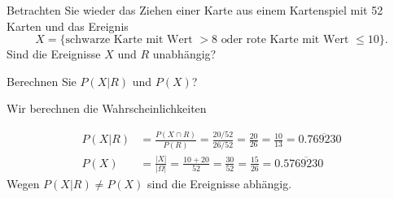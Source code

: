 Betrachten Sie wieder das Ziehen einer Karte aus einem Kartenspiel
mit 52 Karten und das Ereignis
\[
X
=
\{
\text{schwarze Karte mit Wert $>8$ oder rote Karte mit Wert $\le 10$}
\}.
\]
Sind die Ereignisse $X$ und $R$ unabhängig?

\begin{hinweis}
Berechnen Sie $P(X|R)$ und $P(X)$?
\end{hinweis}

Wir berechnen die Wahrscheinlichkeiten
\begin{loesung}
\begin{align*}
P(X|R)
&=
\frac{P(X\cap R)}{P(R)}
=
\frac{20/52}{26/52}
=
\frac{20}{26}
=
\frac{10}{13}
=
0.\overline{769230}
\\
P(X)
&=
\frac{|X|}{|\Omega|}
=
\frac{10+20}{52}
=
\frac{30}{52}
=
\frac{15}{26}
=
0.5\overline{769230}
\end{align*}
Wegen $P(X|R)\ne P(X)$ sind die Ereignisse abhängig.
\end{loesung}


